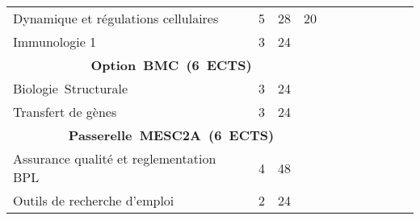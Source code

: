 \begin{tabular}{|m{5cm}|cm{0.75cm}|cm{0.75cm}|cm{0.75cm}|cm{0.75cm}|cm{0.75cm}|}
 \color{black} Dynamique et régulations cellulaires & \color{black} 5 & \color{black} 28 & \color{black} 20 & \\ \cline{1-5}

 \cellcolor{couleurClaire} \color{couleurTexte} Immunologie 1 & \cellcolor{couleurClaire} \color{couleurTexte} 3 & \cellcolor{couleurClaire} \color{couleurTexte} 24 & \cellcolor{couleurClaire} \color{couleurTexte} & \cellcolor{couleurClaire} 
\\ \cline{1-5}
\multicolumn{5}{|c|}{\color{black} \mbox{\textbf{Option BMC (6 ECTS)}}}  \\ \cline{1-5}

 \color{black} \mbox{Biologie Structurale} & \color{black} 3 & \color{black} 24 & \color{black} & \color{black} \\ \cline{1-5}

 \cellcolor{couleurClaire} \color{couleurTexte} Transfert de gènes  & \cellcolor{couleurClaire} \color{couleurTexte} 3 & \cellcolor{couleurClaire} \color{couleurTexte} 24 & \cellcolor{couleurClaire} \color{couleurTexte} & \cellcolor{couleurClaire} \color{couleurTexte} \\ \cline{1-5}

\multicolumn{5}{|c|}{\color{black} \mbox{\textbf{Passerelle MESC2A (6 ECTS)}}}  \\ \cline{1-5}

 \color{black} Assurance qualité et reglementation BPL & \color{black} 4 & \color{black} 48 & \color{black} & \color{black} \\ \cline{1-5}

 \cellcolor{couleurClaire} \color{couleurTexte} Outils de recherche d'emploi  & \cellcolor{couleurClaire} \color{couleurTexte} 2 & \cellcolor{couleurClaire} \color{couleurTexte} 24 & \cellcolor{couleurClaire} \color{couleurTexte} & \cellcolor{couleurClaire} \color{couleurTexte} \\ \cline{1-5}

\end{tabular}

